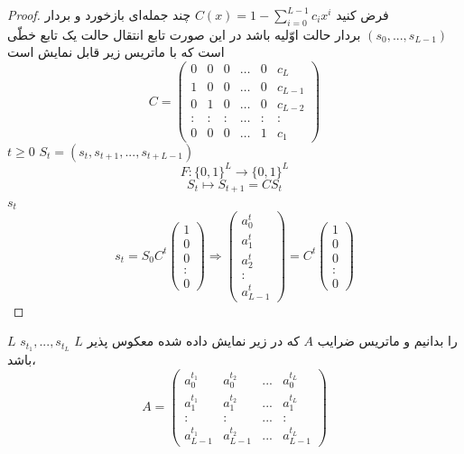 \begin{proof}
	فرض کنید 
	$C(x) = 1-\sum_{i = 0}^{L-1}c_{i}x^{i}$
	چند جمله‌ای بازخورد 
	و بردار 
	$(s_{0},...,s_{L-1})$
	بردار حالت اوّلیه باشد در این صورت تابع انتقال حالت یک تابع خطّی است که با ماتریس زیر قابل نمایش است
	$$
	C = \begin{pmatrix}
	0 & 0 & 0 & \dots & 0 & c_{L} \\ 
	1 & 0 & 0 & \dots & 0 & c_{L-1} \\ 
	0 & 1 & 0 & \dots & 0 & c_{L-2} \\ 
	\colon & \colon & \colon & \dots & \colon & \colon \\ 
	0 & 0 & 0 & \dots & 1 & c_{1}
	\end{pmatrix} 
	$$
	$t\geq 0$
	$S_{t} = (s_{t},s_{t+1},...,s_{t+L-1})$
	$$F:\{0,1\}^{L}\rightarrow \{0,1\}^{L}$$
	$$S_{t}\mapsto S_{t+1} = C S_{t}$$
	$s_{t}$
	$$s_{t} = S_{0}C^{t}\begin{pmatrix}
	1 \\ 
	0 \\ 
	0 \\ 
	\colon \\ 
	0
	\end{pmatrix} \Longrightarrow \begin{pmatrix}
	a_{0}^{t} \\ 
	a_{1}^{t} \\ 
	a_{2}^{t} \\ 
	\colon \\ 
	a_{L-1}^{t}
	\end{pmatrix} = C^{t} \begin{pmatrix}
	1 \\ 
	0 \\ 
	0 \\ 
	\colon \\ 
	0
	\end{pmatrix}$$
	
\end{proof}

$L$
$s_{t_{1}},...,s_{t_{L}}$
$L$
را بدانیم و ماتریس  ضرایب 
$A$
که در زیر نمایش داده شده معکوس پذیر باشد، 
$$A = \begin{pmatrix}
a_{0}^{t_{1}} & a_{0}^{t_{2}} & ... & a_{0}^{t_{L}} \\ 
a_{1}^{t_{1}} & a_{1}^{t_{2}} & ... & a_{1}^{t_{L}} \\ 
\colon & \colon & ... & \colon \\ 
a_{L-1}^{t_{1}} & a_{L-1}^{t_{2}} & ... & a_{L-1}^{t_{L}}
\end{pmatrix} $$

